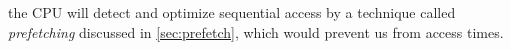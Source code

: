 \begin{comment}
   We will see why this measurement was conducted with random instead of sequential
   accesses in \cref{sec:prefetch}.

   \Cref{sec:prefetch} \alts{explains, will explain} the reason for \x{going through the
   trouble of} \alts{using, conducting} random accesses instead of just reading the array
   sequentially\x{for this measurement}.
\end{comment}
the CPU will detect and optimize sequential access by a technique called
\emph{prefetching} discussed in \cref{sec:prefetch}, which would prevent us from
 access times.

%
\begin{comment}
   \begin{figure}
      \inputminted[firstline=9]{c}{access-times/access-times.c}
      \captionof{listing}{TODO}
      \label{lst:access-times}
   \end{figure}
\end{comment}



%
\begin{center} %
   \inputminted[firstline=12]{c}{access-times/access-times.c}
   \label{lst:access-times}
\end{center}

